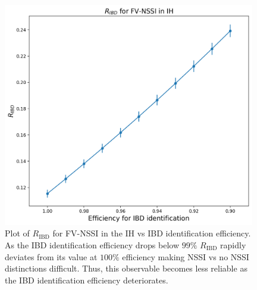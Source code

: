 \documentclass[a4paper,12pt]{article}
\begin{document}
\begin{table}[t]
\caption*{$R_{\text{IBD}}\times 100\%$}
\centering
{}
\caption{$R_{\text{IBD}}$\eqref{eq:ratio}, the ratio of total events detected during the late time regime ($1\text{ s} < t < 20\text{ s}$) in the ES and OCC channels to those in the IBD channel for both NH and IH cases, assuming $100\%$ IBD identification efficiency. The ratio provides a largely model-independent signature for NSSI modifications. In this case, there is a significant difference between flavor-violating NSSI and flavor-preserving NSSI/standard in the IH case. With better ES channel statistics, such as from a liquid-Ar detector like DUNE, we expect to see much smaller statistical variation in the ratios, as well as a difference in the NH case, as predicted by the flavor history plots in Fig.~\ref{fig:fe_fp} \&~\ref{fig:fe_fv}.}
\label{tab:evt_ratio}
\end{table}

\begin{figure}[t]
\begin{center}
\includegraphics[width=11cm]{R_vs_IBD_id_eff.png}
\caption{Plot of $R_{\text{IBD}}$ for FV-NSSI in the IH vs IBD identification efficiency. As the IBD identification efficiency drops below $99\%$ $R_{\text{IBD}}$ rapidly deviates from its value at $100\%$ efficiency making NSSI vs no NSSI distinctions difficult. Thus, this observable becomes less reliable as the IBD identification efficiency deteriorates.}
\label{fig:ibd_eff}
\end{center}
\end{figure}
\end{document}
